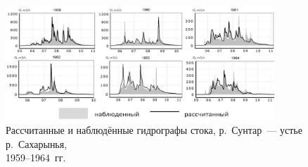 \begin{figure}[H]
  \vspace{-8pt}
  \begin{center}
    \includegraphics[width=0.9\textwidth]{authors/nesterova-1-fig-2.jpg}
  \end{center}
\vspace{-10pt}
  \caption{Рассчитанные и наблюдённые гидрографы стока, р.~Сунтар~--- устье
р.~Сахарынья,\\ 1959--1964~гг.}
  \label{fig:nesterova-1-fig-2}
\vspace{-10pt}
\end{figure}
